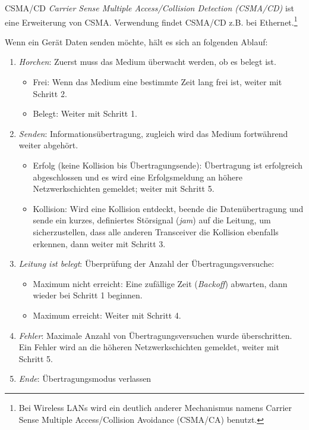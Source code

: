 \begin{defi}{CSMA/CD}
    \emph{Carrier Sense Multiple Access/Collision Detection (CSMA/CD)} ist eine Erweiterung von CSMA.
    Verwendung findet CSMA/CD z.B. bei Ethernet.\footnote{ Bei Wireless LANs wird ein deutlich anderer Mechanismus namens Carrier Sense Multiple Access/Collision Avoidance (CSMA/CA) benutzt.}

    Wenn ein Gerät Daten senden möchte, hält es sich an folgenden Ablauf:
    \begin{enumerate}
        \item \emph{Horchen}: Zuerst muss das Medium überwacht werden, ob es belegt ist.
              \begin{itemize}
                  \item Frei: Wenn das Medium eine bestimmte Zeit lang frei ist, weiter mit Schritt 2.
                  \item Belegt: Weiter mit Schritt 1.
              \end{itemize}
        \item \emph{Senden}: Informationsübertragung, zugleich wird das Medium fortwährend weiter abgehört.
              \begin{itemize}
                  \item Erfolg (keine Kollision bis Übertragungsende): Übertragung ist erfolgreich abgeschlossen und es wird eine Erfolgsmeldung an höhere Netzwerkschichten gemeldet; weiter mit Schritt 5.
                  \item Kollision: Wird eine Kollision entdeckt, beende die Datenübertragung und sende ein kurzes, definiertes Störsignal (\emph{jam}) auf die Leitung, um sicherzustellen, dass alle anderen Transceiver die Kollision ebenfalls erkennen, dann weiter mit Schritt 3.
              \end{itemize}
        \item \emph{Leitung ist belegt}: Überprüfung der Anzahl der Übertragungsversuche:
              \begin{itemize}
                  \item Maximum nicht erreicht: Eine zufällige Zeit (\emph{Backoff}) abwarten, dann wieder bei Schritt 1 beginnen.
                  \item Maximum erreicht: Weiter mit Schritt 4.
              \end{itemize}
        \item \emph{Fehler}: Maximale Anzahl von Übertragungsversuchen wurde überschritten. Ein Fehler wird an die höheren Netzwerkschichten gemeldet, weiter mit Schritt 5.
        \item \emph{Ende}: Übertragungsmodus verlassen
    \end{enumerate}
\end{defi}

